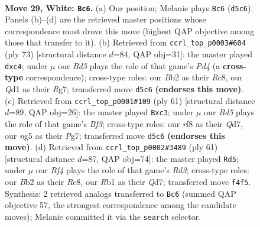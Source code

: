 \documentclass[11pt]{article}
\begin{document}
\clearpage

\begin{figure}[p]\centering
\begin{subfigure}{0.46\textwidth}\centering
\resizebox{\linewidth}{!}{%
\newchessgame
\chessboard[
  setfen={3rqr1k/8/1p6/p1pBbpn1/2P2R2/1P5p/PB1P4/1R1Q2K1 w - - 0 29},
  showmover=false,
  pgfstyle=straightmove, color=movearrow, markmove={d5-c6}
]}
\caption{}
\end{subfigure}\hfill
\begin{subfigure}{0.46\textwidth}\centering
\resizebox{\linewidth}{!}{%
\newchessgame
\chessboard[
  setfen={2r5/6rk/1P2pq2/3p1p2/p1NP1Pb1/2R5/P3P1BK/R6Q b - - 2 37},
  showmover=false,
  pgfstyle=straightmove, color=movearrow, markmove={d5-c4}
]}
\caption{}
\end{subfigure}
\\[4pt]
\begin{subfigure}{0.46\textwidth}\centering
\resizebox{\linewidth}{!}{%
\newchessgame
\chessboard[
  setfen={8/3q1rpk/p4b1p/1p1b1p2/1P3P2/P1B4P/3Q3K/4RR2 b - - 3 31},
  showmover=false,
  pgfstyle=straightmove, color=movearrow, markmove={f6-c3}
]}
\caption{}
\end{subfigure}\hfill
\begin{subfigure}{0.46\textwidth}\centering
\resizebox{\linewidth}{!}{%
\newchessgame
\chessboard[
  setfen={2r4k/3q2p1/1b1r3p/2B2p2/1PQ2P2/P5P1/7P/2R1R1K1 b - - 2 31},
  showmover=false,
  pgfstyle=straightmove, color=movearrow, markmove={d6-d5}
]}
\caption{}
\end{subfigure}
\caption{\textbf{Move 29, White: \texttt{Bc6}.} (a) Our position; Melanie plays \texttt{Bc6} (\texttt{d5c6}). Panels (b)--(d) are the retrieved master positions whose correspondence most drove this move (highest QAP objective among those that transfer to it). (b) Retrieved from \texttt{ccrl\_top\_p0003\#604} (ply 73) [structural distance $d$=84, QAP obj=31]: the master played \texttt{dxc4}; under $\mu$ our \emph{Bd5} plays the role of that game's \emph{Pd4} (a \textbf{cross-type} correspondence); cross-type roles: our \emph{B}b2 as their \emph{R}c8, our \emph{Q}d1 as their \emph{R}g7; transferred move \texttt{d5c6} \textbf{(endorses this move)}. (c) Retrieved from \texttt{ccrl\_top\_p0001\#109} (ply 61) [structural distance $d$=89, QAP obj=26]: the master played \texttt{Bxc3}; under $\mu$ our \emph{Bd5} plays the role of that game's \emph{Bf3}; cross-type roles: our \emph{r}f8 as their \emph{Q}d7, our \emph{n}g5 as their \emph{P}g7; transferred move \texttt{d5c6} \textbf{(endorses this move)}. (d) Retrieved from \texttt{ccrl\_top\_p0002\#3489} (ply 61) [structural distance $d$=87, QAP obj=74]: the master played \texttt{Rd5}; under $\mu$ our \emph{Rf4} plays the role of that game's \emph{Rd3}; cross-type roles: our \emph{B}b2 as their \emph{R}c8, our \emph{R}b1 as their \emph{Q}d7; transferred move \texttt{f4f5}. Synthesis: 2 retrieved analogs transferred to \texttt{Bc6} (summed QAP objective 57, the strongest correspondence among the candidate moves); Melanie committed it via the \texttt{search} selector.}
\label{fig:thought-m56}
\end{figure}
\end{document}

